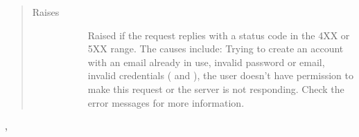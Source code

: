 \documentclass[letterpaper,10pt,english]{sphinxmanual}
\begin{document}
\begin{fulllineitems}
\begin{quote}
\begin{description}
\begin{description}
\end{description}

\item[{Raises}] \leavevmode\begin{description}
\item[{}] \leavevmode
Raised if the request replies with a status code in the 4XX or 5XX range.
The causes include: Trying to create an account with an email already in
use, invalid password or email, invalid credentials ( and
), the user doesn’t have permission to make this request or the
server is not responding. Check the error messages for more information.

\end{description}

\end{description}\end{quote}




{\hyperref[\detokenize{grafanaAPI:grafanaAPI.request}]{}}, {\hyperref[\detokenize{grafanaAPI:grafanaAPI.createAccount}]{}}



\end{fulllineitems}

\end{document}
